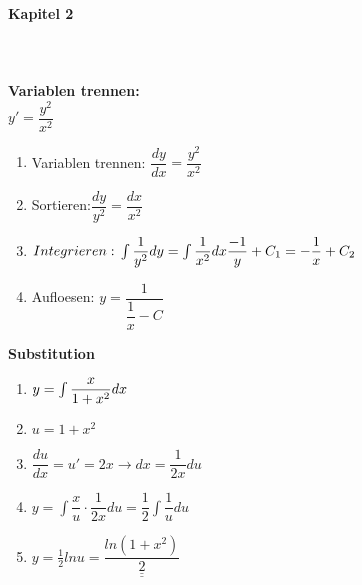 \begin{figure}[!htb]
\begin{minipage}{0.3\textwidth}
\begin{tiny}
       \paragraph{Kapitel 2}\hfill\\\\
        \textbf{Variablen trennen:}\\ $y'=\dfrac{y^2}{x^2}$\\
        \begin{enumerate}
            \item Variablen trennen: $\dfrac{dy}{dx}=\dfrac{y^2}{x^2}$
            \item Sortieren:$\dfrac{dy}{y^2}=\dfrac{dx}{x^2}$
            \item $Integrieren:\\ \int \dfrac{1}{y^2}dy= \int \dfrac{1}{x^2}dx\\\\
            \dfrac{-1}{y}+C_1=-\dfrac{1}{x}+C_2$
            \item Aufloesen: $y=\dfrac{1}{\dfrac{1}{x}-C}$\\
        \end{enumerate}
        \textbf{Substitution}
        \newline
    \begin{enumerate}
        \item $y=\int \dfrac{x}{1+x^2}dx\\$
		\item $u=1+x^2$\\
		\item $\dfrac{du}{dx}=u'=2x\rightarrow dx=\dfrac{1}{2x}du$\\
		\item $y=\int \dfrac{x}{u}\cdot \dfrac{1}{2x}du=\dfrac{1}{2}\int \dfrac{1}{u}du$\\
		\item $y= \frac{1}{2}lnu=\underline{\underline{\dfrac{ln(1+x^2)}{2}}}$\\\\
    \end{enumerate}
		
 
       

\end{tiny}
\end{minipage}
\end{figure}
